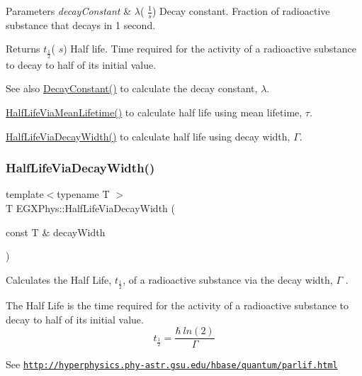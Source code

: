 \begin{DoxyParams}{Parameters}
{\em decay\+Constant} & $\lambda$( $\frac{1}{s}$) Decay constant. Fraction of radioactive substance that decays in 1 second. \\
\hline
\end{DoxyParams}
\begin{DoxyReturn}{Returns}
$t_{\frac{1}{2}}$( $s$) Half life. Time required for the activity of a radioactive substance to decay to half of its initial value. 
\end{DoxyReturn}
\begin{DoxySeeAlso}{See also}
\hyperlink{group___atomic_ga904edce5aad441b4a0873b3b1a83c7f2}{Decay\+Constant()} to calculate the decay constant, $\lambda$. 

\hyperlink{group___half_life_gacddef16b62e98b214ec8dd8af7da7dce}{Half\+Life\+Via\+Mean\+Lifetime()} to calculate half life using mean lifetime, $\tau$. 

\hyperlink{group___half_life_gaba3fda944d1a68ee1016a1f2f5809359}{Half\+Life\+Via\+Decay\+Width()} to calculate half life using decay width, $\Gamma$. 
\end{DoxySeeAlso}
\mbox{\label{group___half_life_gaba3fda944d1a68ee1016a1f2f5809359}} 
\subsubsection{\texorpdfstring{Half\+Life\+Via\+Decay\+Width()}{HalfLifeViaDecayWidth()}}
{\footnotesize\ttfamily template$<$typename T $>$ \\
T E\+G\+X\+Phys\+::\+Half\+Life\+Via\+Decay\+Width (\begin{DoxyParamCaption}\item[{const T \&}]{decay\+Width }\end{DoxyParamCaption})}



Calculates the Half Life, $t_{\frac{1}{2}}$, of a radioactive substance via the decay width, $\Gamma$ . 

The Half Life is the time required for the activity of a radioactive substance to decay to half of its initial value. \[t_{\frac{1}{2}}=\frac{\hbar \ ln(2)}{\Gamma}\]

See \href{http://hyperphysics.phy-astr.gsu.edu/hbase/quantum/parlif.html}{\tt http\+://hyperphysics.\+phy-\/astr.\+gsu.\+edu/hbase/quantum/parlif.\+html}

